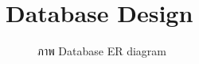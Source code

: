 \documentclass[12pt,oneside,openright,a4paper]{cpe-thai-project}
\begin{document}
 
\section{Database Design}
\begin{figure}[!ht]\centering
    \setlength{\fboxrule}{0.2mm} %
    \setlength{\fboxsep}{1cm}
    \caption{ภาพ Database ER diagram}\label{fig:database}
   \end{figure}
   
\newpage
\end{document}
